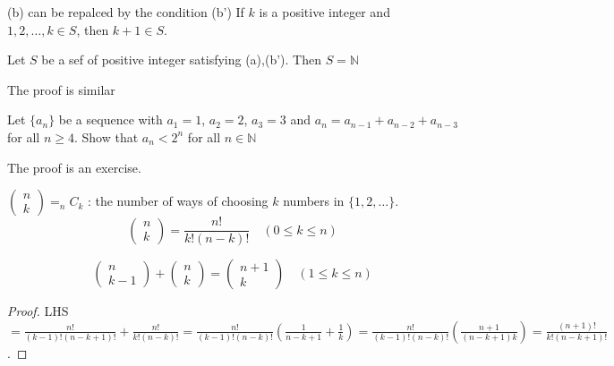 \documentclass{article}
\begin{document}
\begin{multicols}{2}
\begin{remark}
(b) can be repalced by the condition (b') If $k$ is a positive integer and $1,2,\dots,k \in S$, then $k+1\in S$.
\end{remark}

\begin{mytheorem}
Let $S$ be a sef of positive integer satisfying (a),(b'). Then $S=\mathbb{N}$
\end{mytheorem}
The proof is similar

\begin{example}
Let $\{a_n\}$ be a sequence with $a_1=1$, $a_2=2$, $a_3=3$ and $a_n=a_{n-1}+a_{n-2}+a_{n-3}$ for all $n\geq 4$. Show that $a_n<2^n$ for all $n\in \mathbb{N}$
\end{example}
The proof is an exercise.

\begin{mytheorem}
\begingroup
\everymath{\displaystyle}
$\begin{pmatrix}
n\\k
\end{pmatrix}= _nC_k$
\endgroup
: the number of ways of choosing $k$ numbers in $\{1,2,\dots\}$.
\begingroup
\everymath{\displaystyle}
$$\begin{pmatrix}
n\\
k
\end{pmatrix}=\frac{n!}{k!(n-k)!}\quad (0\leq k\leq n)$$
\endgroup
\end{mytheorem}

\begin{mytheorem}
\begingroup
\everymath{\displaystyle}
$$
\begin{pmatrix}
n\\
k-1
\end{pmatrix}+
\begin{pmatrix}
n\\
k
\end{pmatrix}=
\begin{pmatrix}
n+1\\
k
\end{pmatrix}
\quad (1\leq k\leq n)
$$
\endgroup
\end{mytheorem}

\begin{proof}
LHS $\displaystyle = \frac{n!}{(k-1)!(n-k+1)!} + \frac{n!}{k!(n-k)!}=\frac{n!}{(k-1)!(n-k)!}\left(\frac{1}{n-k+1}+\frac{1}{k}\right)=\frac{n!}{(k-1)!(n-k)!}(\frac{n+1}{(n-k+1)k})=\frac{(n+1)!}{k!(n-k+1)!}$.
\end{proof}


\end{multicols}
\end{document}
